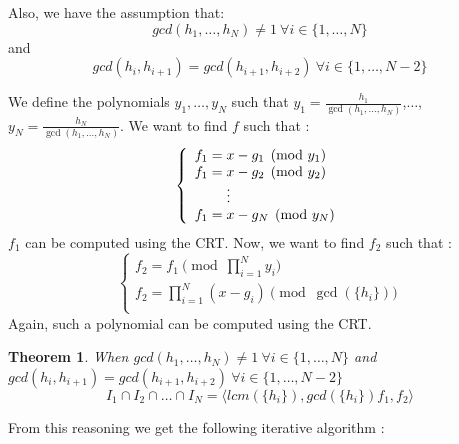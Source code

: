 \documentclass{article}
\newtheorem{theorem}{Theorem}[section]
\begin{document}
\begin{flushleft}

Also, we have the assumption that: \[gcd(h_{1},\dots,h_{N})\neq1\ \forall i \in \{1,\dots,N\}\]
and \[gcd(h_{i},h_{i+1})=gcd(h_{i+1},h_{i+2})\ \forall i \in \{1,\dots,N-2\}\]

We define the polynomials $y_{1},\dots,y_{N}$ such that $y_{1} = \displaystyle \frac{h_{1}}{\gcd(h_{1},\dots,h_{N})}$,$\dots$, $y_{N} = \displaystyle \frac{h_{N}}{\gcd(h_{1},\dots,h_{N})}$. We want to find $f$ such that :
\begin{displaymath}
    \left\{
    \begin{array}{ll}
        f_{1} = x-g_{1} \pmod {y_{1}} \\
        f_{1} = x-g_{2} \pmod {y_{2}} \\
        \hspace{8mm} \vdots \\
        f_{1} = x-g_{N} \pmod{y_{N}}\\
    \end{array}
    \right.
\end{displaymath}
$f_{1}$ can be computed using the CRT. Now, we want to find $f_{2}$ such that : 
\begin{displaymath}
    \left\{
    \begin{array}{ll}
        f_{2} = f_{1} \pmod {\prod_{i=1}^{N} y_{i}} \\
        f_{2} = \prod^{N}_{i=1} (x-g_{i}) \pmod {\gcd(\{h_{i}\})} \\
    \end{array}
    \right.
\end{displaymath}
Again, such a polynomial can be computed using the CRT\@.

\end{flushleft}

\begin{theorem}
    When $gcd(h_{1},\dots,h_{N})\neq1\ \forall i \in \{1,\dots,N\}$ and $gcd(h_{i},h_{i+1})=gcd(h_{i+1},h_{i+2})\ \forall i \in \{1,\dots,N-2\}$
    \begin{displaymath}
        I_{1} \cap I_{2} \cap \dots \cap I_{N} = \langle lcm(\{h_{i}\}), gcd(\{h_{i}\})f_{1},f_{2} \rangle
    \end{displaymath}
\end{theorem}

From this reasoning we get the following iterative algorithm : 
\end{document}
